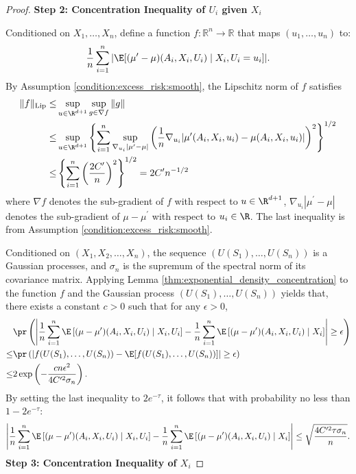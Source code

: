 \begin{proof}
\noindent \textbf{Step 2: Concentration Inequality of $ U_i$ given $X_i$}

\noindent Conditioned on $X_1,\ldots, X_n$, define a function $f: \mathbb{R}^n \to \mathbb{R}$ that maps $(u_1, \dots, u_n)$ to:
$$\frac{1}{n}\sum_{i=1}^n |\E[(\mu^\prime -\mu)(A_i,X_i, U_i)\mid X_i,U_i = u_i]|.$$
By Assumption \ref{condition:excess_risk:smooth}, the Lipschitz norm of $f$ satisfies 
\begin{align*}
    \|f\|_{\text{Lip}}\leq & \sup_{u\in\R^{d+1}}\sup_{g\in\nabla f}\|g\|\\
    \leq& \sup_{u\in\R^{d+1}}\left\{\sum_{i=1}^n \sup_{\nabla_{u_i}|\mu^\prime-\mu|}\left(\frac{1}{n}\nabla_{u_i} |\mu^\prime(A_i,X_i, u_i) - \mu(A_i,X_i, u_i)|\right)^2\right\}^{1/2}\\ 
    \leq & \left\{\sum_{i=1}^n \left(\frac{2C^\prime}{n}\right)^2\right\}^{1/2}=2C^{\prime}n^{-1/2}
\end{align*}
where $\nabla f$ denotes the sub-gradient of $f$ with respect to $u\in\R^{d+1}$, $\nabla_{u_i}|\mu^\prime-\mu|$ denotes the sub-gradient of $\mu-\mu^\prime$ with respect to $u_i\in\R$. The last inequality is from Assumption \ref{condition:excess_risk:smooth}.

Conditioned on $(X_1,X_2,\ldots,X_n)$, the sequence $( U(S_1),\ldots, U(S_n))$ is a Gaussian processes, and $\sigma_n$ is the supremum of the spectral norm of its covariance matrix. Applying Lemma \ref{thm:exponential_density_concentration} to the function $f$ and the Gaussian process $( U(S_1),\ldots, U(S_n))$ yields that, there exists a constant $c>0$ such that for any $\epsilon>0$,
\begin{align*}
&\pr\left(\left|\frac{1}{n}\sum_{i=1}^n\E\left[(\mu - \mu^\prime)(A_i,X_i,U_i)\mid X_i,U_i\right] - \frac{1}{n}\sum_{i=1}^n\E\left[(\mu - \mu^\prime)(A_i,X_i,U_i)\mid X_i\right]\right|\geq \epsilon\right)\\
    \leq & \pr\left(\left|f( U(S_1),\ldots,U(S_n))-\E[f( U(S_1),\ldots,U(S_n))]\right|\geq \epsilon\right)\\
    \leq & 2 \exp\left(-\frac{cn\epsilon^2}{4C^{\prime2}\sigma_n}\right).
\end{align*}
By setting the last inequality to $2e^{-\tau}$, it follows that with probability no less than $1-2e^{-\tau}$:
$$\left|\frac{1}{n}\sum_{i=1}^n\E\left[(\mu - \mu^\prime)(A_i,X_i,U_i)\mid X_i,U_i\right] - \frac{1}{n}\sum_{i=1}^n\E\left[(\mu - \mu^\prime)(A_i,X_i,U_i)\mid X_i\right]\right|\leq \sqrt{\frac{4C^{\prime2}\tau\sigma_n}{n}}.$$
\noindent \textbf{Step 3: Concentration Inequality of  $X_i$ }


\end{proof}
